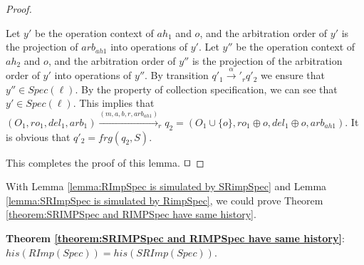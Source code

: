 \begin {proof}
\begin{itemize}
    Let $y'$ be the operation context of $\mathit{ah}_1$ and $o$, and the arbitration order of $y'$ is the projection of $\mathit{arb}_{\mathit{ah1}}$ into operations of $y'$. Let $y''$ be the operation context of $\mathit{ah}_2$ and $o$, and the arbitration order of $y''$ is the projection of the arbitration order of $y'$ into operations of $y''$. By transition $q'_1 {\xrightarrow{\alpha}'}_r q'_2$ we ensure that $y'' \in \mathit{Spec}(\ell)$. By the property of collection specification, we can see that $y' \in \mathit{Spec}(\ell)$. This implies that $(O_1,\mathit{ro}_1,\mathit{del}_1,\mathit{arb}_1) {\xrightarrow{(m,a,b,r,\mathit{arb}_{\mathit{ah1}})}}_r q_2 =  (O_1 \cup \{ o \},\mathit{ro}_1 \oplus o ,\mathit{del}_1 \oplus o,\mathit{arb}_{\mathit{ah1}})$. It is obvious that $q'_2 = \mathit{frg}(q_2,S)$.
\end{itemize}
This completes the proof of this lemma. $\qed$
\end {proof}



With Lemma \ref{lemma:RImpSpec is simulated by SRimpSpec} and Lemma \ref{lemma:SRImpSpec is simulated by RimpSpec}, we could prove Theorem \ref{theorem:SRIMPSpec and RIMPSpec have same history}. 



{\noindent \bf Theorem \ref{theorem:SRIMPSpec and RIMPSpec have same history}}: $\mathit{his}(\mathit{RImp}(\mathit{Spec})) = \mathit{his}(\mathit{SRImp}(\mathit{Spec}))$.

